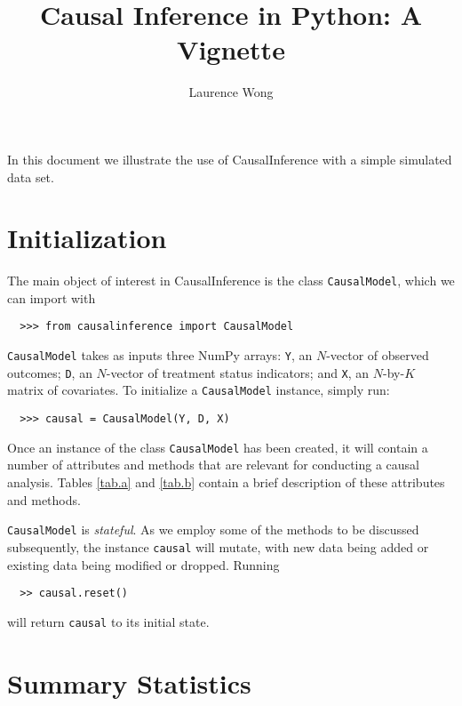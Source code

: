 \documentclass[12pt]{article}
\theoremstyle{definition}
\theoremstyle{definition}
\theoremstyle{definition}
\theoremstyle{remark}
\begin{document}

\title{Causal Inference in Python: A Vignette}
\author{Laurence Wong}
\maketitle

In this document we illustrate the use of CausalInference with a simple simulated data set.

\section{Initialization} \label{sec.a}

The main object of interest in CausalInference is the class \texttt{CausalModel}, which we can import with
\begin{verbatim}
  >>> from causalinference import CausalModel
\end{verbatim}
\texttt{CausalModel} takes as inputs three NumPy arrays: \texttt{Y}, an $N$-vector of observed outcomes; \texttt{D}, an $N$-vector of treatment status indicators; and \texttt{X}, an $N$-by-$K$ matrix of covariates. To initialize a \texttt{CausalModel} instance, simply run:
\begin{verbatim}
  >>> causal = CausalModel(Y, D, X)
\end{verbatim}

Once an instance of the class \texttt{CausalModel} has been created, it will contain a number of attributes and methods that are relevant for conducting a causal analysis. Tables \ref{tab.a} and \ref{tab.b} contain a brief description of these attributes and methods.

\texttt{CausalModel} is \textit{stateful}. As we employ some of the methods to be discussed subsequently, the instance \texttt{causal} will mutate, with new data being added or existing data being modified or dropped. Running
\begin{verbatim}
  >> causal.reset()
\end{verbatim}
will return \texttt{causal} to its initial state.

\section{Summary Statistics} \label{sec.b}
\end{document}

